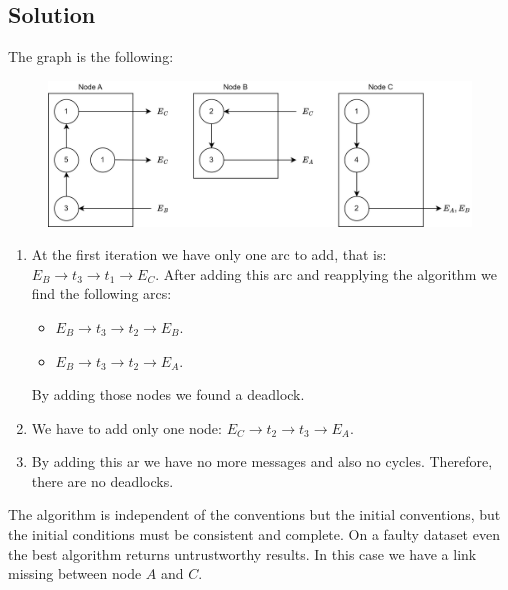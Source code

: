 \subsection*{Solution}
The graph is the following: 
\begin{figure}[H]
    \centering
    \includegraphics[width=0.75\linewidth]{images/Ob4.png}
\end{figure}
\begin{enumerate}
    \item At the first iteration we have only one arc to add, that is: $E_B \rightarrow t_3 \rightarrow t_1 \rightarrow E_C$. 
        After adding this arc and reapplying the algorithm we find the following arcs: 
        \begin{itemize}
            \item $E_B \rightarrow t_3 \rightarrow t_2 \rightarrow E_B$.
            \item $E_B \rightarrow t_3 \rightarrow t_2 \rightarrow E_A$.
        \end{itemize}
        By adding those nodes we found a deadlock. 
    \item We have to add only one node: $E_C \rightarrow t_2 \rightarrow t_3 \rightarrow E_A$.
    \item By adding this ar we have no more messages and also no cycles. 
        Therefore, there are no deadlocks. 
\end{enumerate}
The algorithm is independent of the conventions but the initial conventions, but the initial conditions must be consistent and complete. 
On a faulty dataset even the best algorithm returns untrustworthy results. 
In this case we have a link missing between node $A$ and $C$.